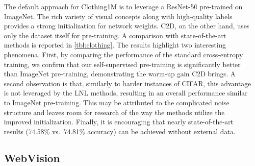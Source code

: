 \documentclass[10pt,twocolumn,letterpaper]{article}
\renewcommand{\cite}[1]{\citep{#1}}
\begin{document}
The default approach \cite{patrini2017making,tanaka2018joint,zhang2019metacleaner,li2019learning,yi2019pencil,han2019deepself,li2020dividemix,liu2020earlylearning} for Clothing1M is to leverage a ResNet-50 pre-trained on ImageNet. The rich variety of visual concepts along with high-quality labels provides a strong initialization for network weights. C2D, on the other hand, uses only the dataset itself for pre-training. 
A comparison with state-of-the-art methods is reported in \cref{tbl:clothing}. The results highlight two interesting phenomena. First, by comparing the performance of the standard cross-entropy training, we confirm that our self-supervised pre-training is significantly better than ImageNet pre-training, demonstrating the warm-up gain C2D brings. 
A second observation is that, similarly to harder instances of CIFAR, this advantage is not leveraged by the LNL methods, resulting in an overall performance similar to ImageNet pre-training. This may be attributed to the complicated noise structure and leaves room for research of the way the methods utilize the improved initialization. Finally, it is encouraging that nearly state-of-the-art results (74.58\% vs.\ 74.81\% accuracy) can be achieved without external data. 







\subsection{WebVision}
\end{document}
